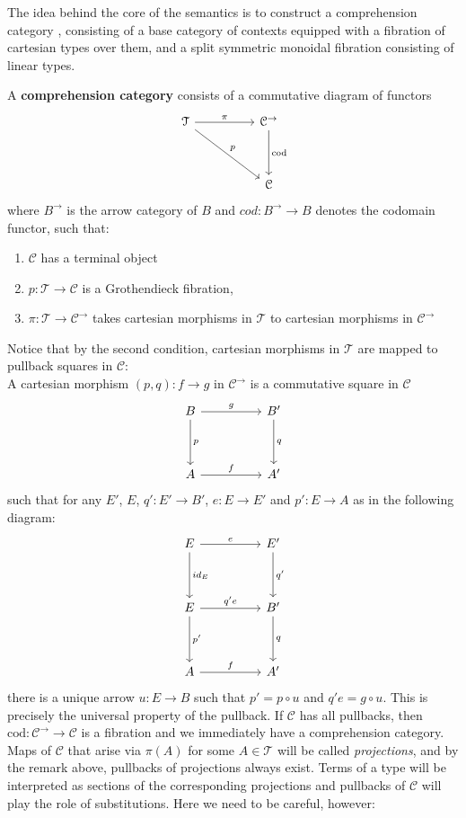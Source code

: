 \documentclass[a4paper,english]{lipics-v2018}
\begin{document}
The idea behind the core of the semantics is to construct a comprehension category \cite{jacobs}, consisting of a base category of contexts equipped with a fibration of cartesian types over them, and a split symmetric monoidal fibration consisting of linear types.
\begin{definition}
A \textbf{comprehension category} consists of a commutative diagram of functors
\[
\begin{tikzcd}[row sep=huge, column sep=huge]
\mathcal{T} \ar[rd, "p"] \ar[r, "\pi"]  & \mathcal{C}^{\to} \ar[d, "\text{cod}"]\\
& \mathcal{C}
\end{tikzcd}
\]
where $B^\to$ is the arrow category of $B$ and $cod : B^\to \to B$ denotes the codomain functor, such that:
\begin{enumerate}
\item $\mathcal{C}$ has a terminal object
\item $p : \mathcal{T} \to \mathcal{C}$ is a Grothendieck fibration,
\item $\pi : \mathcal{T} \to \mathcal{C}^\to$ takes cartesian morphisms in $\mathcal{T}$ to cartesian morphisms in $\mathcal{C}^\to$
\end{enumerate}
Notice that by the second condition, cartesian morphisms in $\mathcal{T}$ are mapped to pullback squares in $\mathcal{C}$:\\
A cartesian morphism $(p, q) : f \to g$ in $\mathcal{C}^\to$ is a commutative square in $\mathcal{C}$
\[
\begin{tikzcd}[row sep=huge, column sep=huge]
B \ar[r, "g"] \ar[d, "p"] & B' \ar[d, "q"]\\
A \ar[r,"f"] & A'
\end{tikzcd}
\]
such that for any $E'$, $E$, $q' : E' \to B'$, $e : E \to E'$ and $p' : E \to A$ as in the following diagram:
\[
\begin{tikzcd}[row sep=huge, column sep=huge]
E \ar[d, "id_E"] \ar[r, "e"] & E' \ar[d, "q'"] \\
E \ar[d, "p'"] \ar[r, "q'e"] & B' \ar[d,"q"] \\
A \ar[r, "f"] & A'
\end{tikzcd}
\]
there is a unique arrow $u : E \to B$ such that $p' = p \circ u$ and $q'e = g \circ u$. This is precisely the universal property of the pullback.
If $\mathcal{C}$ has all pullbacks, then $\text{cod} : \mathcal{C}^\to \to \mathcal{C}$ is a fibration and we immediately have a comprehension category.
Maps of $\mathcal{C}$ that arise via $\pi(A)$ for some $A \in \mathcal{T}$ will be called \textit{projections}, and by the remark above, pullbacks of projections always exist. Terms of a type will be interpreted as sections of the corresponding projections and pullbacks of $\mathcal{C}$ will play the role of substitutions. Here we need to be careful, however:
\end{definition}
\end{document}
